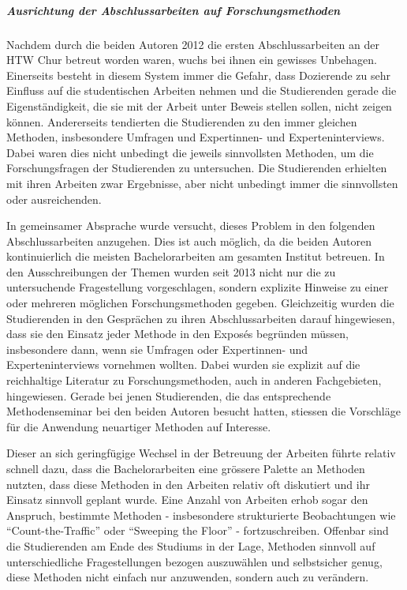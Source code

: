 \documentclass[a4paper,
fontsize=11pt,
oneside,
numbers=noperiodatend,
parskip=half-,
bibliography=totoc,
final
]{scrartcl}
\begin{document}
\subparagraph{Ausrichtung der Abschlussarbeiten auf
Forschungsmethoden}\label{ausrichtung-der-abschlussarbeiten-auf-forschungsmethoden}

Nachdem durch die beiden Autoren 2012 die ersten Abschlussarbeiten an
der HTW Chur betreut worden waren, wuchs bei ihnen ein gewisses
Unbehagen. Einerseits besteht in diesem System immer die Gefahr, dass
Dozierende zu sehr Einfluss auf die studentischen Arbeiten nehmen und
die Studierenden gerade die Eigenständigkeit, die sie mit der Arbeit
unter Beweis stellen sollen, nicht zeigen können. Andererseits
tendierten die Studierenden zu den immer gleichen Methoden, insbesondere
Umfragen und Expertinnen- und Experteninterviews. Dabei waren dies nicht
unbedingt die jeweils sinnvollsten Methoden, um die Forschungsfragen der
Studierenden zu untersuchen. Die Studierenden erhielten mit ihren
Arbeiten zwar Ergebnisse, aber nicht unbedingt immer die sinnvollsten
oder ausreichenden.

In gemeinsamer Absprache wurde versucht, dieses Problem in den folgenden
Abschlussarbeiten anzugehen. Dies ist auch möglich, da die beiden
Autoren kontinuierlich die meisten Bachelorarbeiten am gesamten Institut
betreuen. In den Ausschreibungen der Themen wurden seit 2013 nicht nur
die zu untersuchende Fragestellung vorgeschlagen, sondern explizite
Hinweise zu einer oder mehreren möglichen Forschungsmethoden gegeben.
Gleichzeitig wurden die Studierenden in den Gesprächen zu ihren
Abschlussarbeiten darauf hingewiesen, dass sie den Einsatz jeder Methode
in den Exposés begründen müssen, insbesondere dann, wenn sie Umfragen
oder Expertinnen- und Experteninterviews vornehmen wollten. Dabei wurden
sie explizit auf die reichhaltige Literatur zu Forschungsmethoden, auch
in anderen Fachgebieten, hingewiesen. Gerade bei jenen Studierenden, die
das entsprechende Methodenseminar bei den beiden Autoren besucht hatten,
stiessen die Vorschläge für die Anwendung neuartiger Methoden auf
Interesse.

Dieser an sich geringfügige Wechsel in der Betreuung der Arbeiten führte
relativ schnell dazu, dass die Bachelorarbeiten eine grössere Palette an
Methoden nutzten, dass diese Methoden in den Arbeiten relativ oft
diskutiert und ihr Einsatz sinnvoll geplant wurde. Eine Anzahl von
Arbeiten erhob sogar den Anspruch, bestimmte Methoden - insbesondere
strukturierte Beobachtungen wie \enquote{Count-the-Traffic} oder
\enquote{Sweeping the Floor} - fortzuschreiben. Offenbar sind die
Studierenden am Ende des Studiums in der Lage, Methoden sinnvoll auf
unterschiedliche Fragestellungen bezogen auszuwählen und selbstsicher
genug, diese Methoden nicht einfach nur anzuwenden, sondern auch zu
verändern.
\end{document}
